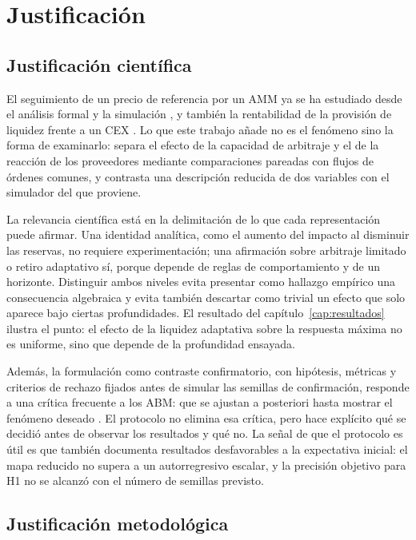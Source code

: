 \chapter{Justificación}
\label{cap:justificacion}

\section{Justificación científica}

El seguimiento de un precio de referencia por un AMM ya se ha estudiado desde el análisis formal y la simulación \cite{angeris2020uniswap}, y también la rentabilidad de la provisión de liquidez frente a un CEX \cite{campbell2025optimal,milionis2022lvr}. Lo que este trabajo añade no es el fenómeno sino la forma de examinarlo: separa el efecto de la capacidad de arbitraje y el de la reacción de los proveedores mediante comparaciones pareadas con flujos de órdenes comunes, y contrasta una descripción reducida de dos variables con el simulador del que proviene.

La relevancia científica está en la delimitación de lo que cada representación puede afirmar. Una identidad analítica, como el aumento del impacto al disminuir las reservas, no requiere experimentación; una afirmación sobre arbitraje limitado o retiro adaptativo sí, porque depende de reglas de comportamiento y de un horizonte. Distinguir ambos niveles evita presentar como hallazgo empírico una consecuencia algebraica y evita también descartar como trivial un efecto que solo aparece bajo ciertas profundidades. El resultado del capítulo~\ref{cap:resultados} ilustra el punto: el efecto de la liquidez adaptativa sobre la respuesta máxima no es uniforme, sino que depende de la profundidad ensayada.

Además, la formulación como contraste confirmatorio, con hipótesis, métricas y criterios de rechazo fijados antes de simular las semillas de confirmación, responde a una crítica frecuente a los ABM: que se ajustan a posteriori hasta mostrar el fenómeno deseado \cite{fagiolo2007critical}. El protocolo no elimina esa crítica, pero hace explícito qué se decidió antes de observar los resultados y qué no. La señal de que el protocolo es útil es que también documenta resultados desfavorables a la expectativa inicial: el mapa reducido no supera a un autorregresivo escalar, y la precisión objetivo para H1 no se alcanzó con el número de semillas previsto.

\section{Justificación metodológica}

